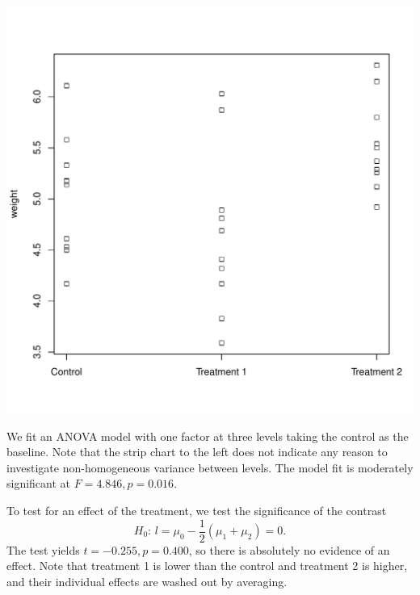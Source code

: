 \documentclass{homework}
\begin{document}
\begin{solution}
  \begin{minipage}{.4\textwidth}
  \includegraphics[width=\textwidth]{strip_plant.pdf}
  \end{minipage}
  \begin{minipage}{.55\textwidth}
  We fit an ANOVA model with one factor at three levels taking the control as the baseline. Note that the strip chart to the left does not indicate any reason to investigate non-homogeneous variance between levels.  The model fit is moderately significant at $F=4.846,p=0.016$.
  
  To test for an effect of the treatment, we test the significance of the contrast 
  $$H_0:\,l= \mu_0 - \frac12(\mu_1 + \mu_2) = 0.$$  
The test yields $t=-0.255,p=0.400$, so there is absolutely no evidence of an effect.  Note that treatment 1 is lower than the control and treatment 2 is higher, and their individual effects are washed out by averaging.  
\end{minipage}
\end{solution}
\end{document}
